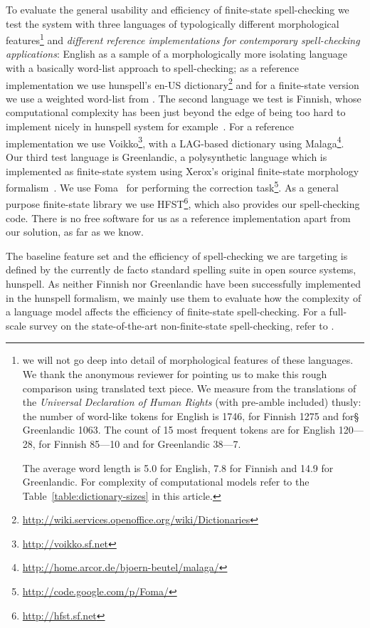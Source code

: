 \documentclass[11pt]{article}
\begin{document}
To evaluate the general usability and efficiency of finite-state spell-checking
we test the system with three languages of typologically different
morphological features\footnote{we will not go deep into detail of morphological
features of these languages. We thank the anonymous reviewer for pointing us
to make this rough comparison using translated text piece. We measure from the translations of the
\emph{Universal Declaration of Human Rights} (with pre-amble included) thusly:
the number of word-like tokens for English is 1746, for Finnish 1275 and for§
Greenlandic 1063. The count of 15 most frequent tokens are for English 120---28,
for Finnish 85---10 and for Greenlandic 38---7. 


The average word length is 5.0 for English, 7.8 for Finnish and 14.9 for
Greenlandic. For complexity of computational models refer to the 
Table~\ref{table:dictionary-sizes} in this article.

} and \emph{different reference implementations for
contemporary spell-checking applications}: English as a sample of a
morphologically more isolating language with a basically word-list approach to
spell-checking; as a reference implementation we use hunspell's en-US
dictionary\footnote{\url{http://wiki.services.openoffice.org/wiki/Dictionaries}}
and for a finite-state version we use a weighted word-list from
. The second language we test is Finnish, whose
computational complexity has been just beyond the edge of being too hard to
implement nicely in hunspell system for example~\cite{pitkanen/2006}. For a
reference implementation we use Voikko\footnote{\url{http://voikko.sf.net}},
with a LAG-based dictionary using
Malaga\footnote{\url{http://home.arcor.de/bjoern-beutel/malaga/}}. Our third
test language is Greenlandic, a polysynthetic language which is implemented as
finite-state system using Xerox's original finite-state morphology
formalism~\cite{beesley/2003}. We use Foma~\cite{foma} for performing the
correction task\footnote{\url{http://code.google.com/p/Foma/}}.  As a general
purpose finite-state library we use HFST\footnote{\url{http://hfst.sf.net}},
which also provides our spell-checking code. There is no free software for us
as a reference implementation apart from our solution, as far as we know.

The baseline feature set and the efficiency of spell-checking we are targeting
is defined by the currently de facto standard spelling suite in open source
systems, hunspell. As neither Finnish nor Greenlandic have been successfully
implemented in the hunspell formalism, we mainly use them to evaluate how
the complexity of a language model affects the efficiency of finite-state
spell-checking. For a full-scale survey on the state-of-the-art
non-finite-state spell-checking, refer to .
\end{document}
